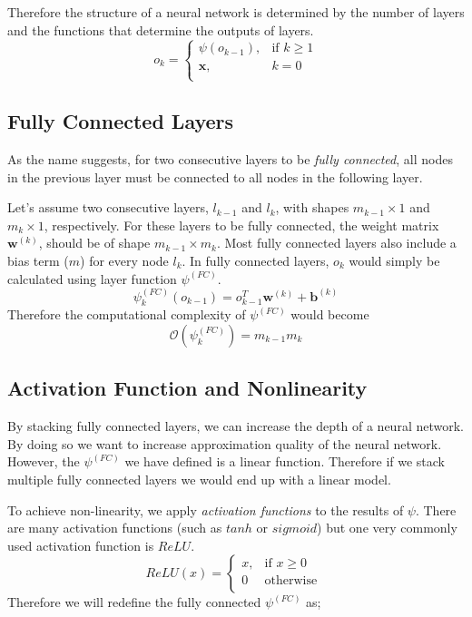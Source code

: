 Therefore the structure of a neural network is determined by the number of layers and the functions that determine the outputs of layers.
\begin{equation}
\label{eq:output_of_layers}
    o_k = 
\begin{cases}
    \psi(o_{k-1}), &\text{if } k\geq 1\\
    \mathbf{x},& k = 0\\
\end{cases}
\end{equation}

\subsection{Fully Connected Layers}
As the name suggests, for two consecutive layers to be \textit{fully connected}, all nodes in the previous layer must be connected to all nodes in the following layer. 

Let's assume two consecutive layers, $l_{k-1}$ and $l_{k}$, with shapes $m_{k-1} \times 1$ and $m_k \times 1$, respectively. For these layers to be fully connected, the weight matrix $\mathbf{w}^{(k)}$, should be of shape $m_{k-1} \times m_{k}$. Most fully connected layers also include a bias term ($m$) for every node $l_k$. In fully connected layers, $o_k$ would simply be calculated using layer function $\psi^{(FC)}$.
$$ \psi^{(FC)}_k(o_{k-1}) = o_{k-1}^T\mathbf{w}^{(k)} + \mathbf{b}^{(k)}$$
Therefore the computational complexity of $\psi^{(FC)}$ would become
$$\mathcal{O}(\psi^{(FC)}_k) = m_{k-1}m_{k}$$

\subsection{Activation Function and Nonlinearity}
By stacking fully connected layers, we can increase the depth of a neural network. By doing so we want to increase approximation quality of the neural network. However, the $\psi^{(FC)}$ we have defined is a linear function. Therefore if we stack multiple fully connected layers we would end up with a linear model. 

To achieve non-linearity, we apply \textit{activation functions} to the results of $\psi$. There are many activation functions (such as $tanh$ or $sigmoid$) but one very commonly used activation function is $ReLU$.  
\begin{equation}
\label{eq:relu_definition}
    ReLU(x) = 
\begin{cases}
    x, & \text{if }x \geq 0\\
    0 &  \text{otherwise }\\
\end{cases}
\end{equation}
Therefore we will redefine the fully connected $\psi^{(FC)}$ as;

